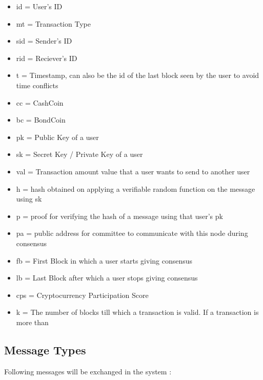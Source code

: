 \begin{itemize}
    \item id = User's ID
	\item mt = Transaction Type
	\item sid = Sender's ID
	\item rid = Reciever's ID
	\item t = Timestamp, can also be the id of the last block seen by the user to avoid time conflicts
	\item cc = CashCoin
	\item bc = BondCoin
	\item pk = Public Key of a user
	\item sk = Secret Key / Private Key of a user
	\item val = Transaction amount value that a user wants to send to another user
	\item h = hash obtained on applying a verifiable random function on the message using sk
	\item p = proof for verifying the hash of a message using that user's pk
	\item pa = public address for committee to communicate with this node during consensus
	\item fb = First Block in which a user starts giving consensus
	\item lb = Last Block after which a user stops giving consensus
	\item cps = Cryptocurrency Participation Score
	\item k = The number of blocks till which a transaction is valid. If a transaction is more than 
\end{itemize}

\subsection{Message Types}

Following messages will be exchanged in the system :

